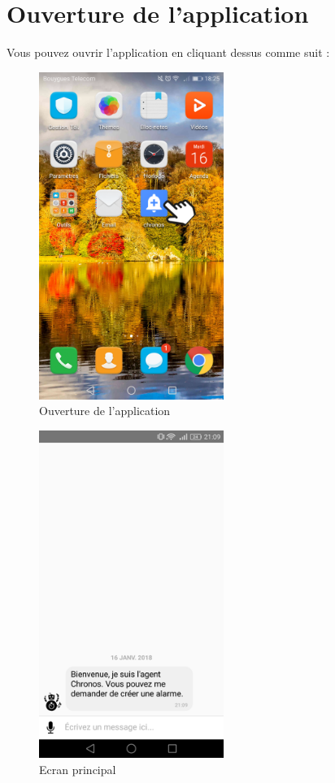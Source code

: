 \section{Ouverture de l'application}

Vous pouvez ouvrir l'application en cliquant dessus comme suit :

\begin{figure}[H]
  \centering
  \includegraphics[width=6cm]{images/A.png}
  \caption{Ouverture de l'application}
\end{figure}

\begin{figure}[H]
  \centering
  \includegraphics[width=6cm]{images/B1.png}
  \caption{Ecran principal}
\end{figure}

